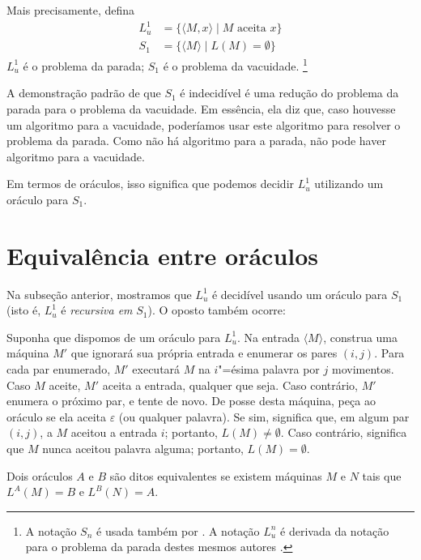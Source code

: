 Mais precisamente, defina
\begin{align*}
    L_u^1 &= \{ \langle M, x \rangle \mid M \text{ aceita } x \} \\
    S_1 &= \{ \langle M \rangle \mid L(M) = \emptyset \}
\end{align*}
$L_u^1$ é o problema da parada; $S_1$ é o problema da vacuidade.%
\footnote{
    A notação $S_n$ é usada também por .
    A notação $L_u^n$ é derivada da notação para o problema da parada
    destes mesmos autores \cite[p.~183]{HopcroftUllman1979}.
}

A demonstração padrão de que $S_1$ é indecidível
é uma redução do problema da parada para o problema da vacuidade.
Em essência, ela diz que,
caso houvesse um algoritmo para a vacuidade,
poderíamos usar este algoritmo para resolver o problema da parada.
Como não há algoritmo para a parada,
não pode haver algoritmo para a vacuidade.

Em termos de oráculos,
isso significa que podemos decidir $L_u^1$
utilizando um oráculo para $S_1$.

\section{Equivalência entre oráculos}

Na subseção anterior,
mostramos que $L_u^1$ é decidível usando um oráculo para $S_1$
(isto é, $L_u^1$ é \emph{recursiva em} $S_1$).
O oposto também ocorre:

Suponha que dispomos de um oráculo para $L_u^1$.
Na entrada $\langle M \rangle$,
construa uma máquina $M'$ que ignorará sua própria entrada
e enumerar os pares $(i, j)$.
Para cada par enumerado,
$M'$ executará $M$ na $i$"=ésima palavra por $j$ movimentos.
Caso $M$ aceite, $M'$ aceita a entrada, qualquer que seja.
Caso contrário, $M'$ enumera o próximo par, e tente de novo.
De posse desta máquina, peça ao oráculo se ela aceita $\varepsilon$
(ou qualquer palavra).
Se sim, significa que, em algum par $(i, j)$,
a $M$ aceitou a entrada $i$; portanto, $L(M) \neq \emptyset$.
Caso contrário, significa que $M$ nunca aceitou palavra alguma;
portanto, $L(M) = \emptyset$.

\begin{definition}
    Dois oráculos $A$ e $B$ são ditos equivalentes
    se existem máquinas $M$ e $N$ tais que
    $L^A(M) = B$ e $L^B(N) = A$.
\end{definition}

